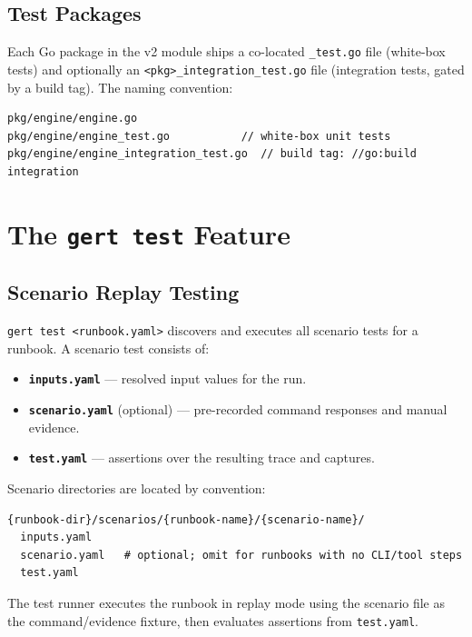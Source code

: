 \subsection{Test Packages}

Each Go package in the v2 module ships a co-located \texttt{\_test.go} file (white-box tests) and optionally an \texttt{<pkg>\_integration\_test.go} file (integration tests, gated by a build tag). The naming convention:

\begin{verbatim}
pkg/engine/engine.go
pkg/engine/engine_test.go           // white-box unit tests
pkg/engine/engine_integration_test.go  // build tag: //go:build integration
\end{verbatim}

\section{The \texttt{gert test} Feature}

\subsection{Scenario Replay Testing}

\texttt{gert test <runbook.yaml>} discovers and executes all scenario tests for a runbook. A scenario test consists of:

\begin{itemize}
  \item \textbf{\texttt{inputs.yaml}} — resolved input values for the run.
  \item \textbf{\texttt{scenario.yaml}} (optional) — pre-recorded command responses and manual evidence.
  \item \textbf{\texttt{test.yaml}} — assertions over the resulting trace and captures.
\end{itemize}

Scenario directories are located by convention:

\begin{verbatim}
{runbook-dir}/scenarios/{runbook-name}/{scenario-name}/
  inputs.yaml
  scenario.yaml   # optional; omit for runbooks with no CLI/tool steps
  test.yaml
\end{verbatim}

The test runner executes the runbook in replay mode using the scenario file as the command/evidence fixture, then evaluates assertions from \texttt{test.yaml}.

